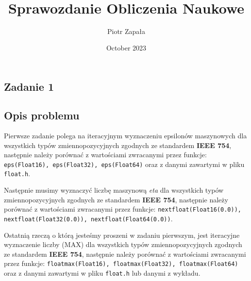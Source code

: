 \documentclass{article}
\title{Sprawozdanie Obliczenia Naukowe}
\author{Piotr Zapała}
\date{October 2023}
\begin{document}
\maketitle

\tableofcontents
\newpage
\begin{center}
    \section{Zadanie 1}
    \subsection{Opis problemu}
    \large Pierwsze zadanie polega na iteracyjnym wyznaczeniu epsilonów maszynowych
     dla wszystkich typów zmiennopozycyjnych zgodnych ze standardem \textbf{IEEE 754}, następnie należy
     porównać z wartościami zwracanymi przez funkcje: \texttt{eps(Float16), eps(Float32), eps(Float64)} 
     oraz z danymi zawartymi w pliku \texttt{float.h}.\vspace*{2mm}

     Następnie musimy wyznaczyć liczbę maszynową \textit{eta}
     dla wszystkich typów zmiennopozycyjnych zgodnych ze standardem \textbf{IEEE 754}, następnie należy
     porównać z wartościami zwracanymi przez funkcje: \texttt{nextfloat(Float16(0.0)), nextfloat(Float32(0.0)), nextfloat(Float64(0.0))}.\vspace*{2mm}

     Ostatnią rzeczą o którą jesteśmy proszeni w zadaniu pierwszym, jest iteracyjne wyznaczenie liczby (MAX)
     dla wszystkich typów zmiennopozycyjnych zgodnych ze standardem \textbf{IEEE 754}, następnie należy
     porównać z wartościami zwracanymi przez funkcje: \texttt{floatmax(Float16), floatmax(Float32), floatmax(Float64)} 
     oraz z danymi zawartymi w pliku \texttt{float.h} lub danymi z wykładu.\vspace*{2mm}

\end{center}
\end{document}
